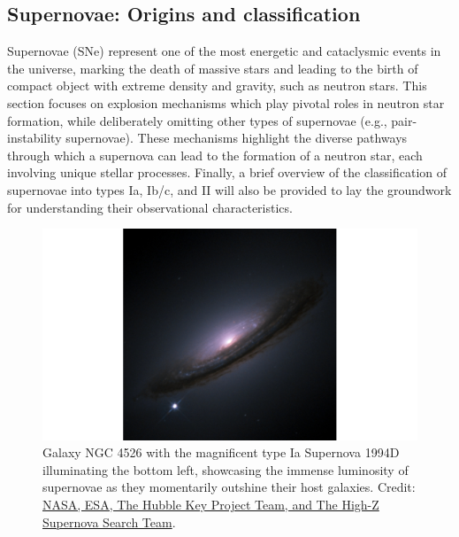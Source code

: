 \documentclass[main.tex]{subfiles}
\begin{document}
    \subsection{Supernovae: Origins and classification}\label{sec:ch1:transients}
    Supernovae (SNe) represent one of the most energetic and cataclysmic events in the universe, marking the death of massive stars and leading to the birth of compact object with extreme density and gravity, such as neutron stars. This section focuses on explosion mechanisms which play pivotal roles in neutron star formation, while deliberately omitting other types of supernovae (e.g., pair-instability supernovae). These mechanisms highlight the diverse pathways through which a supernova can lead to the formation of a neutron star, each involving unique stellar processes. Finally, a brief overview of the classification of supernovae into types Ia, Ib/c, and II will also be provided to lay the groundwork for understanding their observational characteristics.
    \begin{figure}[t]
        \centering
        \includegraphics[scale=0.2]{figures/chapter1/SN1994D_NGC4526.png}
        \caption{Galaxy NGC 4526 with the magnificent type Ia Supernova 1994D illuminating the bottom left, showcasing the immense luminosity of supernovae as they momentarily outshine their host galaxies. Credit: \href{https://hubblesite.org/contents/media/images/1999/19/813-Image.html}{NASA, ESA, The Hubble Key Project Team, and The High-Z Supernova Search Team}.}
        \label{fig:sn1994d}
    \end{figure}
    
\end{document}
